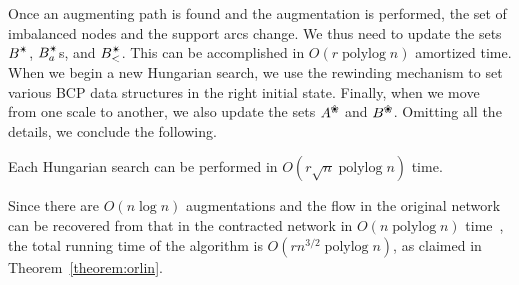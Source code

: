 \documentclass[a4paper,UKenglish,nolineno]{socg-lipics-v2019}
\def\etal{\emph{et~al.}}
\def\etal{\textit{et~al.}}
\def\polylog{\mathop{\mathrm{polylog}}}
\def\alive#1{{#1}^\text{\ding{96}}}
\def\star{\text{\ding{84}}}
\begin{document}
Once an augmenting path is found and the augmentation is performed, the set of
imbalanced nodes and the support arcs change.
We thus need to update the sets $B^\star$, $B_a^\star$s, and $B_<^\star$.
This can be accomplished in $O(r\polylog n)$ amortized time.
When we begin a new Hungarian search, we use the rewinding mechanism
to set various BCP data structures in the right initial state.
Finally, when we move from one scale to another, we also update the sets
$\alive{A}$ and $\alive{B}$.
Omitting all the details, we conclude the following.

\begin{lemma}
Each Hungarian search can be performed in $O(r\sqrt{n}\polylog n)$ time.
\end{lemma}

Since there are $O(n\log n)$ augmentations and the flow in the original network
can be recovered from that in the contracted network in $O(n\polylog n)$
time~\cite{AFPVX17arxiv}, the total running time of the algorithm is
$O(rn^{3/2}\polylog n)$, as claimed in Theorem~\ref{theorem:orlin}.


%



\appendix
\end{document}
